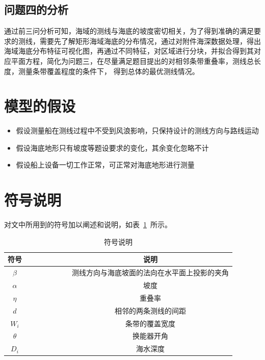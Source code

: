 \documentclass{cumcmthesis}
\begin{document}
\subsection{问题四的分析}

通过前三问分析可知，海域的测线与海底的坡度密切相关，为了得到准确的满足要求的测线，需要先了解矩形海域海底的分布情况，通过对附件海深数据处理，得出海域海底分布特征可视化图，再通过不同特征，对区域进行分块，并拟合得到其对应平面方程，简化为问题三，在尽量满足题目提出的对相邻条带重叠率，测线总长度，测量条带覆盖程度的条件下， 得到总体的最优测线情况。

\section{模型的假设}

\begin{itemize}
\item 	假设测量船在测线过程中不受到风浪影响，只保持设计的测线方向与路线运动
\item 	假设海底地形只有坡度等题设要求的变化，其余变化忽略不计
\item 	假设船上设备一切工作正常，可正常对海底地形进行测量

\end{itemize}

\section{符号说明}

对文中所用到的符号加以阐述和说明，如表~\ref{tab001}~所示。
\begin{table}[!htbp]
	\caption{符号说明}\label{tab001} \centering
	\begin{tabular}{cccccccc}
		\toprule[1.5pt]
		符号 &  &  &  &  &  &  & 说明\\
		\midrule[1pt]
		$\beta$ &  &  &  &  &  &  & 测线方向与海底坡面的法向在水平面上投影的夹角\\
		$\alpha$ &  &  &  &  &  &  & 坡度\\
		$\eta$ &  &  &  &  &  &  & 重叠率\\
		$d$ &  &  &  &  &  &  & 相邻的两条测线的间距\\
		$W_i$ &  &  &  &  &  &  & 条带的覆盖宽度\\
		$\theta$ &  &  &  &  &  &  & 换能器开角\\
		$D_i$ &  &  &  &  &  &  & 海水深度\\
		\bottomrule[1.5pt]
	\end{tabular}
\end{table}
\end{document}
